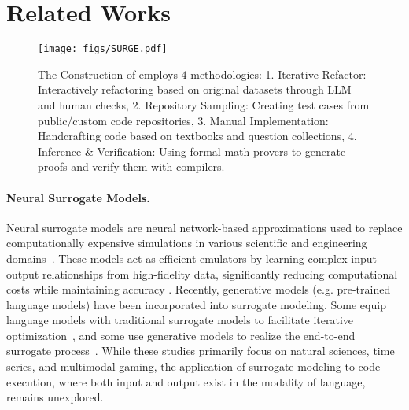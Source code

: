 \section{Related Works}

\begin{figure*}[!ht]
\centering
\texttt{[image: figs/SURGE.pdf]}
\caption{The Construction of \bench employs $4$ methodologies: 1. Iterative Refactor: Interactively refactoring based on original datasets through LLM and human checks, 2. Repository Sampling: Creating test cases from public/custom code repositories, 3. Manual Implementation: Handcrafting code based on textbooks and question collections, 4. Inference \& Verification: Using formal math provers to generate proofs and verify them with compilers.}
\label{fig:construction}
\end{figure*}

\paragraph{Neural Surrogate Models.} Neural surrogate models are neural network-based approximations used to replace computationally expensive simulations in various scientific and engineering domains~\citep{zhang2024artificialintelligencesciencequantum, sun2019review}. These models act as efficient emulators by learning complex input-output relationships from high-fidelity data, significantly reducing computational costs while maintaining accuracy \citep{raissi2020hidden, sun2020surrogate, bessa2017framework, thuerey2020deep, raissi2019physics, willard2022integrating}. Recently, generative models (e.g. pre-trained language models) have been incorporated into surrogate modeling. Some equip language models with traditional surrogate models to facilitate iterative optimization~\citep{ma2024llmsimulationbileveloptimizers, lyu2025adaptinglearninggroundingllms}, and some use generative models to realize the end-to-end surrogate process~\citep{gruver2024largelanguagemodelszeroshot, hao2024largelanguagemodelssurrogate, wimmer2023leveragingvisionlanguagemodelsgranular, che2024gamegenxinteractiveopenworldgame}. While these studies primarily focus on natural sciences, time series, and multimodal gaming, the application of surrogate modeling to code execution, where both input and output exist in the modality of language, remains unexplored.

